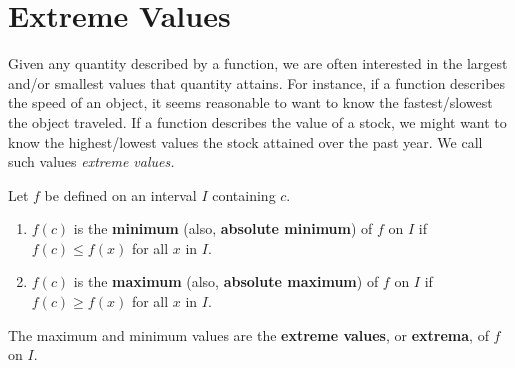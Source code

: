 \section{Extreme Values}\label{sec:extreme_values}


Given any quantity described by a function, we are often interested in the largest and/or smallest values that quantity attains. For instance, if a function describes the speed of an object, it seems reasonable to want to know the fastest/slowest the object traveled. If a function describes the value of a stock, we might want to know the highest/lowest values the stock attained over the past year. We call such values \textit{extreme values.}

%
{Let $f$ be defined on an interval $I$ containing $c$.
\begin{enumerate}
	\item	$f(c)$ is the \textbf{minimum} (also, \textbf{absolute minimum}) of $f$ on $I$ if $f(c) \leq f(x)$ for all $x$ in $I$.
	\item	$f(c)$ is the \textbf{maximum} (also, \textbf{absolute maximum}) of $f$ on $I$ if $f(c) \geq f(x)$ for all $x$ in $I$.
\end{enumerate}
The maximum and minimum values are the \textbf{extreme values}, or \textbf{extrema}, of $f$ on $I$.}

